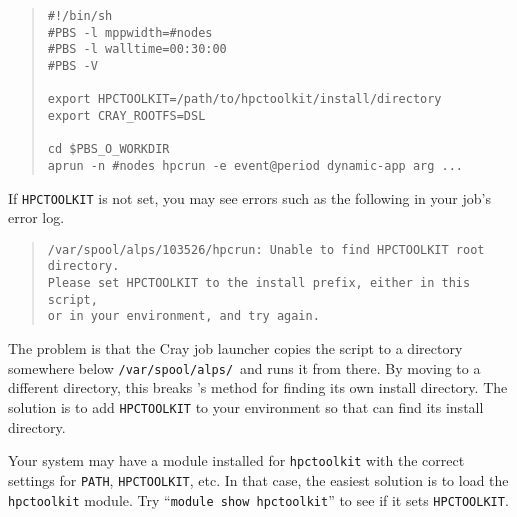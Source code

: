 \begin{quote}
\begin{verbatim}
#!/bin/sh
#PBS -l mppwidth=#nodes
#PBS -l walltime=00:30:00
#PBS -V

export HPCTOOLKIT=/path/to/hpctoolkit/install/directory
export CRAY_ROOTFS=DSL

cd $PBS_O_WORKDIR
aprun -n #nodes hpcrun -e event@period dynamic-app arg ...
\end{verbatim}
\end{quote}

If \verb|HPCTOOLKIT| is not set, you may see errors such as the
following in your job's error log.

\begin{quote}
\begin{verbatim}
/var/spool/alps/103526/hpcrun: Unable to find HPCTOOLKIT root directory.
Please set HPCTOOLKIT to the install prefix, either in this script,
or in your environment, and try again.
\end{verbatim}
\end{quote}

The problem is that the Cray job launcher copies the \hpcrun{}
script to a directory somewhere below \verb|/var/spool/alps/|\ and runs
it from there.  By moving \hpcrun{} to a different directory, this
breaks \hpcrun{}'s method for finding its own install directory.
The solution is to add \verb|HPCTOOLKIT| to your environment so that
\hpcrun{} can find its install directory.

Your system may have a module installed for \verb|hpctoolkit| with the
correct settings for \verb|PATH|, \verb|HPCTOOLKIT|, etc.  In that case,
the easiest solution is to load the \verb|hpctoolkit| module.  Try
``\verb|module show hpctoolkit|'' to see if it sets \verb|HPCTOOLKIT|.
